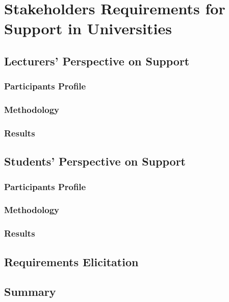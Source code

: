 \chapter{Stakeholders Requirements for \LLLc Support in Universities
\label{cha:model}}

\section{Lecturers' Perspective on \LLLc Support}
\subsection{Participants Profile}
\subsection{Methodology}
\subsection{Results}

\section{Students' Perspective on \LLLc Support}
\subsection{Participants Profile}
\subsection{Methodology}
\subsection{Results}

\section{Requirements Elicitation}

\section{Summary}